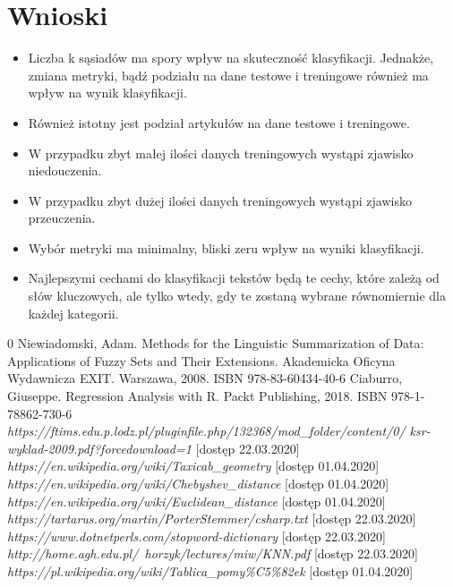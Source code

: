 \documentclass{classrep}
\begin{document}
\section{Wnioski}
\begin{itemize}
	\item Liczba k sąsiadów ma spory wpływ na skuteczność klasyfikacji. Jednakże, zmiana metryki, bądź podziału na dane testowe i treningowe również ma wpływ na wynik klasyfikacji.
	\item Również istotny jest podział artykułów na dane testowe i treningowe. 
	\item W przypadku zbyt małej ilości danych treningowych wystąpi zjawisko niedouczenia.
	\item W przypadku zbyt dużej ilości danych treningowych wystąpi zjawisko przeuczenia.
	\item Wybór metryki ma minimalny, bliski zeru wpływ na wyniki klasyfikacji.
	\item Najlepszymi cechami do klasyfikacji tekstów będą te cechy, które zależą od słów kluczowych, ale tylko wtedy, gdy te zostaną wybrane równomiernie dla każdej kategorii.
\end{itemize}


\begin{thebibliography} {0}
 Niewiadomski, Adam. Methods for the Linguistic Summarization of Data: Applications of Fuzzy Sets and Their Extensions. Akademicka Oficyna Wydawnicza EXIT. Warszawa, 2008. ISBN 978-83-60434-40-6
 Ciaburro, Giuseppe. Regression Analysis with R. Packt Publishing, 2018. ISBN 978-1-78862-730-6
 \textsl{https://ftims.edu.p.lodz.pl/pluginfile.php/132368/mod\_folder/content/0/
ksr-wyklad-2009.pdf?forcedownload=1} [dostęp 22.03.2020]
 \textsl{https://en.wikipedia.org/wiki/Taxicab\_geometry} [dostęp 01.04.2020]
 \textsl{https://en.wikipedia.org/wiki/Chebyshev\_distance} [dostęp 01.04.2020]
 \textsl{https://en.wikipedia.org/wiki/Euclidean\_distance} [dostęp 01.04.2020]
 \textsl{https://tartarus.org/martin/PorterStemmer/csharp.txt} [dostęp 22.03.2020]
 \textsl{https://www.dotnetperls.com/stopword-dictionary} [dostęp 22.03.2020]
 \textsl{http://home.agh.edu.pl/~horzyk/lectures/miw/KNN.pdf} [dostęp 22.03.2020]
 \textsl{https://pl.wikipedia.org/wiki/Tablica\_pomy\%C5\%82ek} [dostęp 01.04.2020]

\end{thebibliography}
\end{document}
